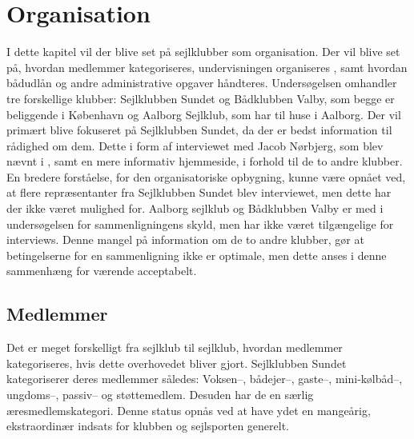 \chapter{Organisation}\label{chap:organisation}

I dette kapitel vil der blive set på sejlklubber som organisation. 
Der vil blive set på, hvordan medlemmer kategoriseres, undervisningen organiseres , samt hvordan bådudlån og andre administrative opgaver håndteres. 
Undersøgelsen omhandler tre forskellige klubber: Sejlklubben Sundet og Bådklubben Valby, som begge er beliggende i København og Aalborg Sejlklub, som har til huse i Aalborg. 
Der vil primært blive fokuseret på Sejlklubben Sundet, da der er bedst information til rådighed om dem. 
Dette i form af interviewet med Jacob Nørbjerg, som blev nævnt i , samt en mere informativ hjemmeside, i forhold til de to andre klubber. 
En bredere forståelse, for den organisatoriske opbygning, kunne være opnået ved, at flere repræsentanter fra Sejlklubben Sundet blev interviewet, men dette har der ikke været mulighed for.
Aalborg sejlklub og Bådklubben Valby er med i undersøgelsen for sammenligningens skyld, men har ikke været tilgængelige for interviews. 
Denne mangel på information om de to andre klubber, gør at betingelserne for en sammenligning ikke er optimale, men dette anses i denne sammenhæng for værende acceptabelt.

\section{Medlemmer}\label{sec:organisation-medlemmer}

Det er meget forskelligt fra sejlklub til sejlklub, hvordan medlemmer kategoriseres, hvis dette overhovedet bliver gjort.
Sejlklubben Sundet kategoriserer deres medlemmer således: Voksen--, bådejer--, gaste--, mini-kølbåd--, ungdoms--, passiv-- og støttemedlem. 
Desuden har de en særlig æresmedlemskategori.
Denne status opnås ved at have ydet en mangeårig, ekstraordinær indsats for klubben og sejlsporten generelt.\citep{sundet_vedtaegter}

